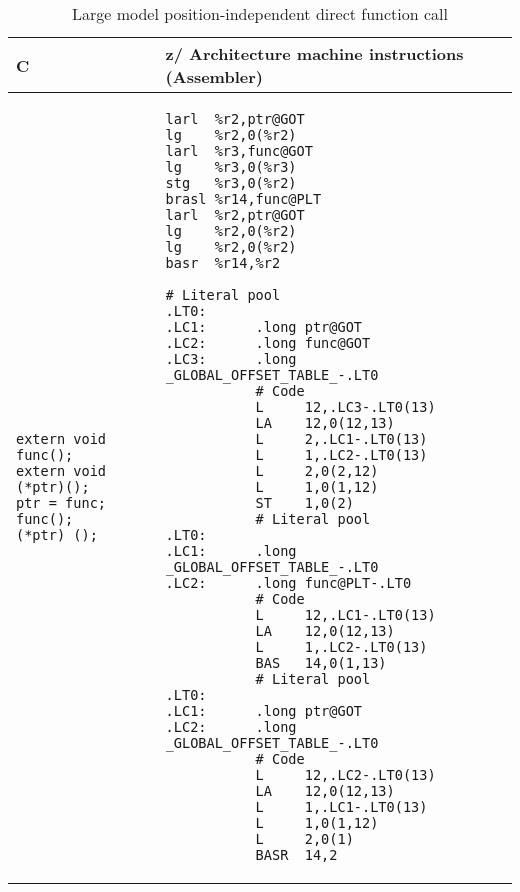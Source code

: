 \documentclass[english,11pt,twoside,toc=bib,toc=idx]{scrreprt}
\newcommand{\ARCH}{z/\kern-1pt Ar\-chi\-tec\-ture}
\newcommand{\ARCH}{ESA/390}
\newenvironment{DIFnomarkup}{}{} %
\begin{document}
\begin{table}
  \centering
  \begin{DIFnomarkup}
  \begin{tabular}{p{}p{}}
    \toprule
    C & \ARCH{} machine instructions (Assembler) \\
    \midrule
\begin{lstlisting}[style=short]
extern void func();
extern void (*ptr)();
ptr = func;
func();
(*ptr) ();
\end{lstlisting}
    &
\ifzseries
\begin{lstlisting}[style=short,language=simpleasm]
larl  %r2,ptr@GOT
lg    %r2,0(%r2)
larl  %r3,func@GOT
lg    %r3,0(%r3)
stg   %r3,0(%r2)
brasl %r14,func@PLT
larl  %r2,ptr@GOT
lg    %r2,0(%r2)
lg    %r2,0(%r2)
basr  %r14,%r2
\end{lstlisting}
\else
\begin{lstlisting}[style=short,language=simpleasm]
           # Literal pool
.LT0:
.LC1:      .long ptr@GOT
.LC2:      .long func@GOT
.LC3:      .long _GLOBAL_OFFSET_TABLE_-.LT0
           # Code
           L     12,.LC3-.LT0(13)
           LA    12,0(12,13)
           L     2,.LC1-.LT0(13)
           L     1,.LC2-.LT0(13)
           L     2,0(2,12)
           L     1,0(1,12)
           ST    1,0(2)
           # Literal pool
.LT0:
.LC1:      .long _GLOBAL_OFFSET_TABLE_-.LT0
.LC2:      .long func@PLT-.LT0
           # Code
           L     12,.LC1-.LT0(13)
           LA    12,0(12,13)
           L     1,.LC2-.LT0(13)
           BAS   14,0(1,13)
           # Literal pool
.LT0:
.LC1:      .long ptr@GOT
.LC2:      .long _GLOBAL_OFFSET_TABLE_-.LT0
           # Code
           L     12,.LC2-.LT0(13)
           LA    12,0(12,13)
           L     1,.LC1-.LT0(13)
           L     1,0(1,12)
           L     2,0(1)
           BASR  14,2
\end{lstlisting}
\fi \\
    \bottomrule
  \end{tabular}
  \end{DIFnomarkup}
  \caption{Large model position-independent {\ifzseries\else direct
      \fi}function call}
  \label{tab:fnlargedirect}
\end{table}
\end{document}
